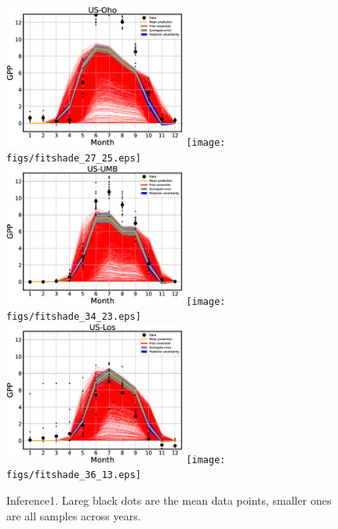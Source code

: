 \documentclass[12pt]{article}
\begin{document}
\begin{figure}[!hb]
\includegraphics[width=0.53\textwidth]{figs/fit1d_27_25.eps}\hfill
\texttt{[image: figs/fitshade\_27\_25.eps]}\\
\includegraphics[width=0.53\textwidth]{figs/fit1d_34_23.eps}\hfill
\texttt{[image: figs/fitshade\_34\_23.eps]}\\
\includegraphics[width=0.53\textwidth]{figs/fit1d_36_13.eps}\hfill
\texttt{[image: figs/fitshade\_36\_13.eps]}
\caption{\label{fig:fits1} Inference1. Lareg black dots are the mean data points, smaller ones are all samples across years.}
\end{figure}
\end{document}
